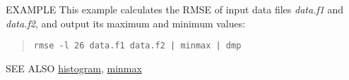 \begin{options}
\end{options}

\begin{qsection}{EXAMPLE}
This example calculates the RMSE of input data files {\em data.f1} and {\em
data.f2}, and output its maximum and minimum values:
\begin{quote}
 \verb!rmse -l 26 data.f1 data.f2 | minmax | dmp !
\end{quote}
\end{qsection}

\begin{qsection}{SEE ALSO}
\hyperlink{histogram}{histogram},
\hyperlink{minmax}{minmax}
\end{qsection}
